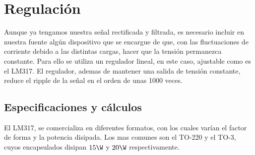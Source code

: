 \documentclass[chaptersright]{informeutn}
\begin{document}
      \section{Regulación}
        Aunque ya tengamos nuestra señal rectificada y filtrada, es necesario incluir en nuestra fuente algún
        dispositivo que se encargue de que, con las fluctuaciones de corriente debido a las distintas cargas, hacer que
        la tensión permanezca constante. Para ello se utiliza un regulador lineal, en este caso, ajustable como es el
        LM317. El regulador, ademas de mantener una salida de tensión constante, reduce el ripple de la señal en el
        orden de unas 1000 veces.

        \subsection{Especificaciones y cálculos}
          El LM317, se comercializa en diferentes formatos, con los cuales varían el factor de forma y la potencia
          disipada. Los mas comunes son el TO-220 y el TO-3, cuyos encapsulados disipan $15\W$ y $20\W$ respectivamente.
\end{document}
